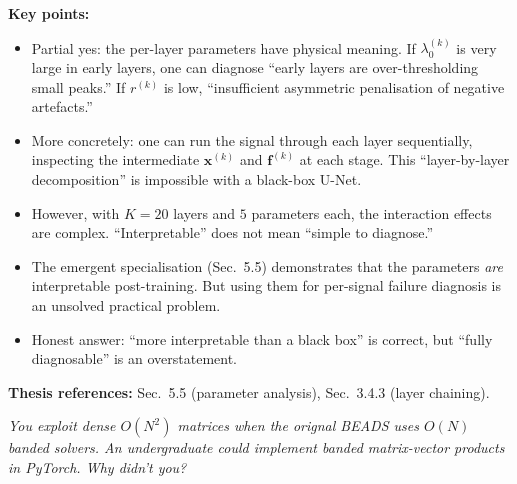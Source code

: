 \documentclass[11pt, letterpaper]{article}
\newcounter{qcounter}
\newcommand{\question}[1]{%
  \stepcounter{qcounter}%
  \begin{questionbox}[Q\theqcounter]%
    \itshape #1%
  \end{questionbox}%
}
\begin{document}
\begin{answerbox}
\textbf{Key points:}
\begin{itemize}[nosep]
  \item Partial yes: the per-layer parameters have physical meaning.
        If $\lambda_0^{(k)}$ is very large in early layers, one can
        diagnose ``early layers are over-thresholding small peaks.''
        If $r^{(k)}$ is low, ``insufficient asymmetric penalisation
        of negative artefacts.''
  \item More concretely: one can run the signal through each layer
        sequentially, inspecting the intermediate $\mathbf{x}^{(k)}$
        and $\mathbf{f}^{(k)}$ at each stage.  This ``layer-by-layer
        decomposition'' is impossible with a black-box U-Net.
  \item However, with $K{=}20$ layers and $5$ parameters each, the
        interaction effects are complex.  ``Interpretable'' does not
        mean ``simple to diagnose.''
  \item The emergent specialisation (Sec.~5.5) demonstrates that
        the parameters \emph{are} interpretable post-training.  But
        using them for per-signal failure diagnosis is an unsolved
        practical problem.
  \item Honest answer: ``more interpretable than a black box'' is
        correct, but ``fully diagnosable'' is an overstatement.
\end{itemize}
\textbf{Thesis references:} Sec.~5.5 (parameter analysis), Sec.~3.4.3 (layer chaining).
\end{answerbox}

\question{You exploit dense $O(N^2)$ matrices when the orignal BEADS uses
$O(N)$ banded solvers.  An undergraduate could implement banded
matrix-vector products in PyTorch.  Why didn't you?}
\end{document}
